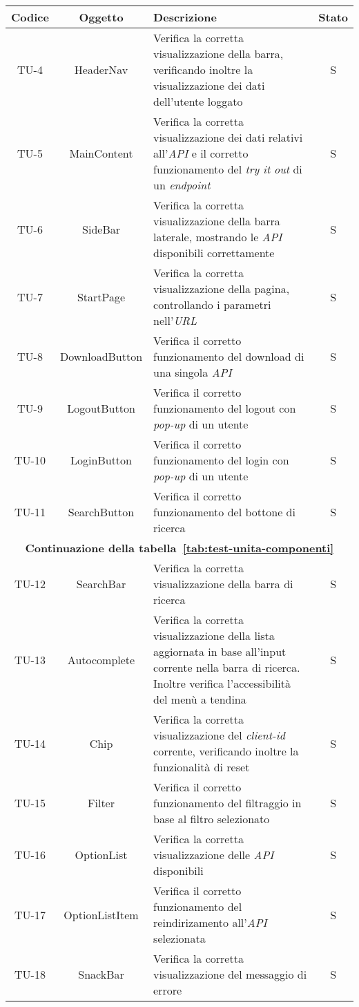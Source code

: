 \begin{center}
  \label{tab:test-unita-componenti}
  \begin{longtable}{|c|c|p{}|c|}
  \hline
  \textbf{Codice} & \textbf{Oggetto} & \textbf{Descrizione} & \textbf{Stato}\\
  \hline
  TU-4 &HeaderNav &Verifica la corretta visualizzazione della barra, verificando inoltre la visualizzazione dei dati dell'utente loggato  &S \\
  \hline
  TU-5 &MainContent &Verifica la corretta visualizzazione dei dati relativi all'\textit{API} e il corretto funzionamento del \textit{try it out} di un \textit{endpoint} &S \\
  \hline
  TU-6 &SideBar &Verifica la corretta visualizzazione della barra laterale, mostrando le \textit{API} disponibili correttamente &S \\
  \hline
  TU-7 &StartPage &Verifica la corretta visualizzazione della pa\-gi\-na, controllando i parametri nell'\textit{URL} &S \\
  \hline
  TU-8 &DownloadButton &Verifica il corretto funzionamento del download di una singola \textit{API} &S \\
  \hline
  TU-9 &LogoutButton &Verifica il corretto funzionamento del logout con \textit{pop-up} di un utente &S \\
  \hline
  TU-10 &LoginButton &Verifica il corretto funzionamento del login con \textit{pop-up} di un utente &S \\
  \hline
  TU-11 &SearchButton &Verifica il corretto funzionamento del bottone di ricerca &S \\
  \hline
  \multicolumn{4}{|c|}{\textbf{Continuazione della tabella~\ref{tab:test-unita-componenti}}} \\
  \hline
  TU-12 &SearchBar &Verifica la corretta visualizzazione della barra di ricerca &S \\
  \hline
  TU-13 &Autocomplete &Verifica la corretta visualizzazione della lista aggiornata in base all'input corrente nella barra di ricerca. Inoltre verifica l'ac\-ces\-si\-bi\-lità del menù a tendina  &S \\
  \hline
  TU-14 &Chip &Verifica la corretta visualizzazione del \textit{client-id} corrente, verificando inoltre la funzionalità di reset &S \\
  \hline
  TU-15 &Filter &Verifica il corretto funzionamento del filtraggio in base al filtro selezionato &S \\
  \hline
  TU-16 &OptionList &Verifica la corretta visualizzazione delle \textit{API} disponibili &S \\
  \hline
  TU-17 &OptionListItem &Verifica il corretto funzionamento del re\-in\-di\-ri\-za\-men\-to all'\textit{API} selezionata &S \\
  \hline
  TU-18 &SnackBar &Verifica la corretta visualizzazione del messaggio di errore &S \\
  \hline
\end{longtable}
\end{center}

